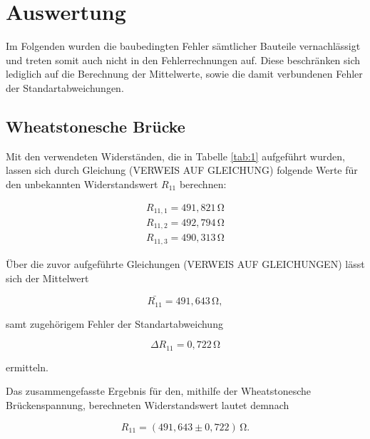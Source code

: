 \section{Auswertung}
\label{sec:Auswertung}

Im Folgenden wurden die baubedingten Fehler sämtlicher Bauteile vernachlässigt und 
treten somit auch nicht in den Fehlerrechnungen auf. Diese beschränken sich lediglich auf 
die Berechnung der Mittelwerte, sowie die damit verbundenen Fehler der Standartabweichungen.


\subsection{Wheatstonesche Brücke}
\label{WheatstonescheBrücke}

Mit den verwendeten Widerständen, die in Tabelle \ref{tab:1} aufgeführt wurden, 
lassen sich durch Gleichung (VERWEIS AUF GLEICHUNG) folgende Werte für den 
unbekannten Widerstandswert $R_{11}$ berechnen:

\begin{align}
R_{11,1} = 491,821\,\si{\ohm} \nonumber \\
R_{11,2} = 492,794\,\si{\ohm} \nonumber \\
R_{11,3} = 490,313\,\si{\ohm} \nonumber 
\end{align}

\noindent
Über die zuvor aufgeführte Gleichungen (VERWEIS AUF GLEICHUNGEN) lässt sich der  
Mittelwert 

\begin{equation}
\bar{R_{11}} = 491,643\,\si{\ohm}, \nonumber
\end{equation}

\noindent
samt zugehörigem Fehler der Standartabweichung

\begin{equation}
\Delta R_{11} = 0,722\, \si{\ohm} \nonumber
\end{equation}

\noindent 
ermitteln.

\noindent
Das zusammengefasste Ergebnis für den, mithilfe der Wheatstonesche Brückenspannung, berechneten Widerstandswert
lautet demnach

\begin{equation}
R_{11} = (491,643 \pm 0,722)\,  \si{\ohm}. \nonumber
\end{equation}
    
